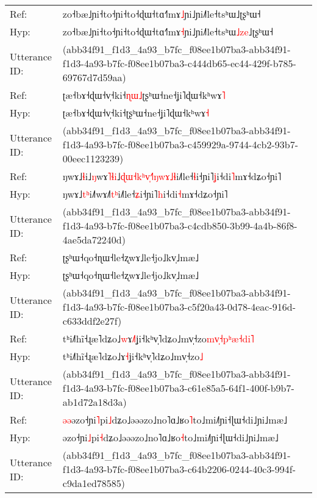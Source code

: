 \documentclass[10pt]{article}
\DeclareRobustCommand{\hl}[1]{{\textcolor{red}{#1}}}
\begin{document}
\begin{longtable}{ll}
Ref: & zo˧bæ˩ɲi˧to˧ɲi˧to˧ɖɯ˧tɑ˧˥mɤ\hl{˩}ɲi˩ɲi˩˥le˧tsʰɯ\hl{}\hl{}\hl{}˩ʈʂʰɯ˧ \\
Hyp: & zo˧bæ˩ɲi˧to˧ɲi˧to˧ɖɯ˧tɑ˧˥mɤ\hl{˧}ɲi˩ɲi˩˥le˧tsʰɯ\hl{˩}\hl{z}\hl{e}˩ʈʂʰɯ˧ \\
\midrule
Utterance ID: & (abb34f91\_f1d3\_4a93\_b7fc\_f08ee1b07ba3-abb34f91-f1d3-4a93-b7fc-f08ee1b07ba3-c444db65-ec44-429f-b785-69767d7d59aa) \\
Ref: & ʈæ˧bɤ˧ɖɯ˧v̩˧ki˧\hl{ɳ}\hl{ɯ}\hl{˩}ʈʂʰɯ˧ne˧ʝi˥ɖɯ˧kʰwɤ\hl{˥} \\
Hyp: & ʈæ˧bɤ˧ɖɯ˧v̩˧ki˧\hl{}\hl{}\hl{}ʈʂʰɯ˧ne˧ʝi˥ɖɯ˧kʰwɤ\hl{˧} \\
\midrule
Utterance ID: & (abb34f91\_f1d3\_4a93\_b7fc\_f08ee1b07ba3-abb34f91-f1d3-4a93-b7fc-f08ee1b07ba3-c459929a-9744-4cb2-93b7-00eec1123239) \\
Ref: & ŋwɤ˩\hl{}\hl{ɬ}i˩\hl{ŋ}wɤ\hl{˥}\hl{ɬ}\hl{i}˩\hl{ɖ}\hl{ɯ}\hl{˧}\hl{k}\hl{ʰ}\hl{v}\hl{̩}\hl{˧}˥\hl{ŋ}\hl{w}\hl{ɤ}\hl{˩}\hl{ɬ}i˩˥le˧\hl{ɬ}i˧ɲi˥\hl{ʝ}i˧di\hl{˥}mɤ˧dʑo˧ɲi˥ \\
Hyp: & ŋwɤ˩\hl{t}\hl{ʰ}i˩\hl{˥}wɤ\hl{}\hl{}\hl{}˩\hl{}\hl{}\hl{}\hl{}\hl{}\hl{}\hl{}\hl{}˥\hl{}\hl{}\hl{}\hl{t}\hl{ʰ}i˩˥le˧\hl{ʑ}i˧ɲi˥\hl{h}i˧di\hl{˧}mɤ˧dʑo˧ɲi˥ \\
\midrule
Utterance ID: & (abb34f91\_f1d3\_4a93\_b7fc\_f08ee1b07ba3-abb34f91-f1d3-4a93-b7fc-f08ee1b07ba3-c4cdb850-3b99-4a4b-86f8-4ae5da72240d) \\
Ref: & ʈʂʰɯ˧qo˧ɳɯ˧le˧ʐwɤ˩le˧jo˩kv̩˩mæ˩ \\
Hyp: & ʈʂʰɯ˧qo˧ɳɯ˧le˧ʐwɤ˩le˧jo˩kv̩˩mæ˩ \\
\midrule
Utterance ID: & (abb34f91\_f1d3\_4a93\_b7fc\_f08ee1b07ba3-abb34f91-f1d3-4a93-b7fc-f08ee1b07ba3-c5f20a43-0d78-4eac-916d-c633ddf2e27f) \\
Ref: & tʰi˩˥hĩ˧ɻæ˥dʑo˩\hl{w}ɤ\hl{˩}\hl{˥}ʝi˧kʰv̩˥dʑo˩mv̩˧zo\hl{m}\hl{v}\hl{̩}\hl{˧}\hl{p}\hl{ʰ}\hl{æ}\hl{˧}\hl{d}\hl{i}\hl{˥} \\
Hyp: & tʰi˩˥hĩ˧ɻæ˥dʑo˩\hl{}ɤ\hl{}\hl{˧}ʝi˧kʰv̩˥dʑo˩mv̩˧zo\hl{}\hl{}\hl{}\hl{}\hl{}\hl{}\hl{}\hl{}\hl{}\hl{}\hl{˩} \\
\midrule
Utterance ID: & (abb34f91\_f1d3\_4a93\_b7fc\_f08ee1b07ba3-abb34f91-f1d3-4a93-b7fc-f08ee1b07ba3-c61e85a5-64f1-400f-b9b7-ab1d72a18d3a) \\
Ref: & \hl{ə}\hl{ə}əzo˧ɲi\hl{˥}pi\hl{˩}dʑo˩əəəzo˩no˥ɑ˩ʁo\hl{˥}to˩mi˩˥ɲi˧ɭɯ˧di˩ɲi˩mæ˩ \\
Hyp: & \hl{}\hl{}əzo˧ɲi\hl{˩}pi\hl{˧}dʑo˩əəəzo˩no˥ɑ˩ʁo\hl{˧}to˩mi˩˥ɲi˧ɭɯ˧di˩ɲi˩mæ˩ \\
\midrule
Utterance ID: & (abb34f91\_f1d3\_4a93\_b7fc\_f08ee1b07ba3-abb34f91-f1d3-4a93-b7fc-f08ee1b07ba3-c64b2206-0244-40c3-994f-c9da1ed78585) \\

\end{longtable}
\end{document}
